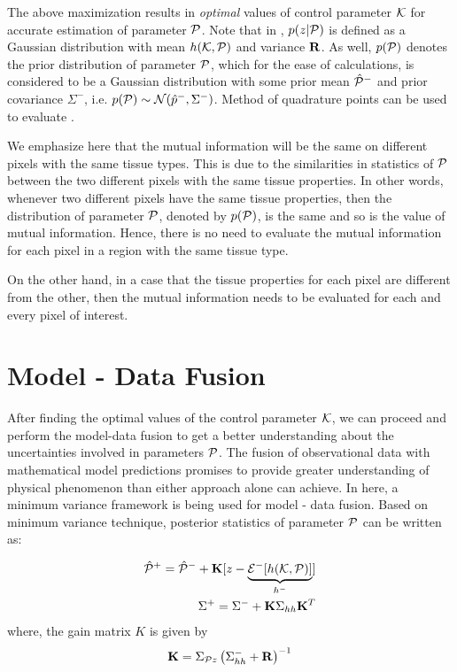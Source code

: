 \documentclass[]{article}
\begin{document}
The above maximization results in \textit{optimal} values of control parameter $\kk$ for accurate estimation of parameter $\p$. Note that in , $p(z|\p)$ is defined as a Gaussian distribution with mean $h(\kk,\p)$ and variance $\R$. As well, $p(\p)$ denotes the prior distribution of parameter $\p$, which for the ease of calculations, is considered to be a Gaussian distribution with some prior mean $\hat{\p}^-$ and prior covariance $\Sigma^-$, i.e. $p(\p)\sim \mathcal{N}(\hat{p}^-,\Sigma^-)$. Method of quadrature points can be used to evaluate . 

We emphasize here that the mutual information will be the same on different pixels with the same tissue types. This is due to the similarities in statistics of $\p$ between the two different pixels with the same tissue properties. In other words, whenever two different pixels have the same tissue properties, then the distribution of parameter $\p$, denoted by $p(\p)$, is the same and so is the value of mutual information. Hence, there is no need to evaluate the mutual information for each pixel in a region with the same tissue type. 

On the other hand, in a case that the tissue properties for each pixel are different from the other, then the mutual information needs to be evaluated for each and every pixel of interest.


\section*{Model - Data Fusion}\label{da}
After finding the optimal values of the control parameter $\kk$, we can proceed and perform the model-data fusion to get a better understanding about the uncertainties involved in parameters $\p$.
The fusion of observational data with mathematical model predictions promises to provide greater understanding of physical phenomenon than either approach alone can achieve. In here, a minimum variance framework is being used for model - data fusion. Based on minimum variance technique, posterior statistics of parameter $\p$ can be written as:

\begin{eqnarray}
\hat{\p}^+=\hat{\p}^-+\K[z-\underbrace{\Ex{h(\kk,\p)}{-}}_{h^-}]\label{minvarmean}\\
\Sigma^+=\Sigma^-+\K\Sigma_{hh}\K^T\label{minvarvar}
\end{eqnarray}
where, %
the gain matrix $K$ is given by
\begin{eqnarray}\label{kgain}
\K=\Sigma_{\p z}\left(\Sigma_{hh}^-+\R\right)^{-1}
\end{eqnarray}
\end{document}
